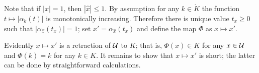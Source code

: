 \documentclass[oneside,a4paper, 12pt]{article}
\begin{document}
Note that if $|x|=1$, then $|\hat x|\le 1$.
By assumption for any $k\in \mathring{K}$ the function $t\mapsto |\alpha_k(t)|$ is monotonically increasing.
Therefore there is unique value $t_x\ge 0$ such that
$|\alpha_{\hat x}(t_x)|=1$;
set $x'=\alpha_{\hat x}(t_x)$ and define the map $\Phi$ as $x\mapsto x'$.

Evidently $x\mapsto x'$ is a retraction of $\mathcal{U}$ to $K$;
that is,
$\Phi(x)\in K$ for any $x\in \mathcal{U}$
and 
$\Phi(k)=k$ for any $k\in K$.
It remains to show that $x\mapsto x'$ is short; 
the latter can be done by straightforward calculations.
\qeds

{\small\sloppy

\printbibliography[heading=bibintoc]

}
\end{document}
